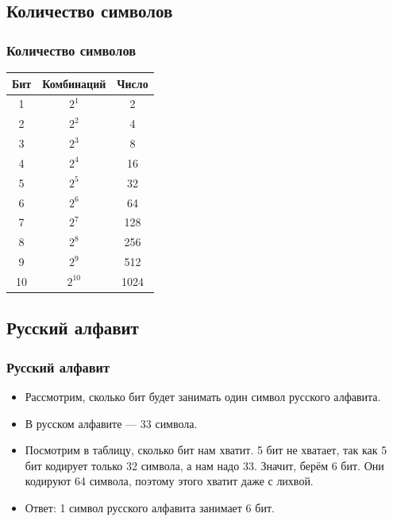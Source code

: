 \documentclass[compress,red]{beamer}
\begin{document}
\subsection{Количество символов}
\begin{frame}[fragile]
  \frametitle{Количество символов}
  \begin{table}
    \begin{center}
      \begin{tabular}{ccc}
      \hline
      Бит & Комбинаций  & Число \\
      \hline
      1 & $2^1$  & 2 \\
      \hline
      2 & $2^2$  & 4 \\
      \hline
      3 & $2^3$  & 8 \\
      \hline
      4 & $2^4$  & 16 \\
      \hline
      5 & $2^5$  & 32 \\
      \hline
      6 & $2^6$  & 64 \\
      \hline
      7 & $2^7$  & 128 \\
      \hline
      8 & $2^8$  & 256 \\
      \hline
      9 & $2^9$  & 512 \\
      \hline
      10 & $2^{10}$  & 1024 \\
      \hline
      \end{tabular}
    \end{center}
  \end{table}
\end{frame}

\subsection{Русский алфавит}
\begin{frame}[fragile]
  \frametitle{Русский алфавит}
  \begin{itemize}
    \item Рассмотрим, сколько бит будет занимать один символ русского алфавита.
    \item В русском алфавите --- 33 символа.
    \item Посмотрим в таблицу, сколько бит нам хватит. 5 бит не хватает, так как 5 бит кодирует только 32 символа, а нам надо 33. Значит, берём 6 бит. Они кодируют 64 символа, поэтому этого хватит даже с лихвой.
    \item Ответ: 1 символ русского алфавита занимает 6 бит.
  \end{itemize}
\end{frame}
\end{document}
